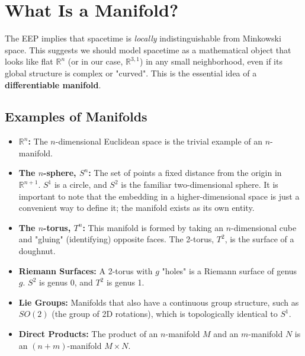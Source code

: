 \documentclass[11pt, a4paper]{report}
\begin{document}
\section{What Is a Manifold?}

The EEP implies that spacetime is \emph{locally} indistinguishable from Minkowski space. This suggests we should model spacetime as a mathematical object that looks like flat $\mathbb{R}^n$ (or in our case, $\mathbb{R}^{3,1}$) in any small neighborhood, even if its global structure is complex or "curved". This is the essential idea of a \textbf{differentiable manifold}.

\subsection*{Examples of Manifolds}

\begin{itemize}
    \item \textbf{$\mathbb{R}^n$:} The $n$-dimensional Euclidean space is the trivial example of an $n$-manifold.
    \item \textbf{The $n$-sphere, $S^n$:} The set of points a fixed distance from the origin in $\mathbb{R}^{n+1}$. $S^1$ is a circle, and $S^2$ is the familiar two-dimensional sphere. It is important to note that the embedding in a higher-dimensional space is just a convenient way to define it; the manifold exists as its own entity.
    \item \textbf{The $n$-torus, $T^n$:} This manifold is formed by taking an $n$-dimensional cube and "gluing" (identifying) opposite faces. The 2-torus, $T^2$, is the surface of a doughnut.
    \item \textbf{Riemann Surfaces:} A 2-torus with $g$ "holes" is a Riemann surface of genus $g$. $S^2$ is genus 0, and $T^2$ is genus 1.
    \item \textbf{Lie Groups:} Manifolds that also have a continuous group structure, such as $SO(2)$ (the group of 2D rotations), which is topologically identical to $S^1$.
    \item \textbf{Direct Products:} The product of an $n$-manifold $M$ and an $m$-manifold $N$ is an $(n+m)$-manifold $M \times N$.
\end{itemize}
\end{document}
